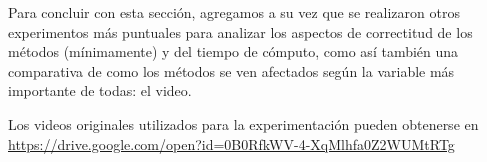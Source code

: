 \par Para concluir con esta secci\'on, agregamos a su vez que se realizaron
otros experimentos m\'as puntuales para analizar los aspectos de correctitud de
los m\'etodos (m\'inimamente) y del tiempo de c\'omputo, como as\'i tambi\'en
una comparativa de como los m\'etodos se ven afectados seg\'un la variable
m\'as importante de todas: el video.

\par Los videos originales utilizados para la experimentaci\'on pueden
obtenerse en \url{https://drive.google.com/open?id=0B0RfkWV-4-XqMlhfa0Z2WUMtRTg}

